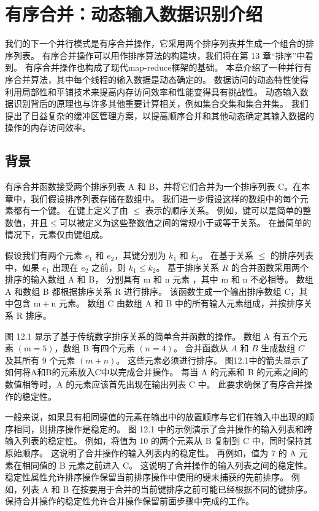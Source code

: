 \section{有序合并：动态输入数据识别介绍}
我们的下一个并行模式是有序合并操作，它采用两个排序列表并生成一个组合的排序列表。 
有序合并操作可以用作排序算法的构建块，我们将在第 13 章“排序”中看到。 有序合并操作也构成了现代map-reduce框架的基础。 
本章介绍了一种并行有序合并算法，其中每个线程的输入数据是动态确定的。 
数据访问的动态特性使得利用局部性和平铺技术来提高内存访问效率和性能变得具有挑战性。 
动态输入数据识别背后的原理也与许多其他重要计算相关，例如集合交集和集合并集。 
我们提出了日益复杂的缓冲区管理方案，以提高顺序合并和其他动态确定其输入数据的操作的内存访问效率。

\subsection{背景}
有序合并函数接受两个排序列表 A 和 B，并将它们合并为一个排序列表 C。在本章中，我们假设排序列表存储在数组中。 
我们进一步假设这样的数组中的每个元素都有一个键。 在键上定义了由 $\leq$ 表示的顺序关系。 
例如，键可以是简单的整数值，并且$\leq$可以被定义为这些整数值之间的常规小于或等于关系。 在最简单的情况下，元素仅由键组成。

假设我们有两个元素 $e_{1}$ 和 $e_{2}$，其键分别为 $k_{1}$ 和 $k_{2}$。 
在基于关系 $\leq$ 的排序列表中，如果 $e_{1}$ 出现在 $e_{2}$ 之前，则 $k_{1} \leq k_{2}$。 
基于排序关系 $R$ 的合并函数采用两个排序的输入数组 $\mathrm{A}$ 和 $\mathrm{B}$，
分别具有 $\mathrm{m}$ 和 $\mathrm{n}$ 元素 ，其中 $\mathrm{m}$ 和 $\mathrm{n}$ 不必相等。 
数组 A 和数组 B 都根据排序关系 $\mathrm{R}$ 进行排序。 
该函数生成一个输出排序数组 $\mathrm{C}$，其中包含 $\mathrm{m}+\mathrm{n}$ 元素。 
数组 $\mathrm{C}$ 由数组 $\mathrm{A}$ 和 $\mathrm{B}$ 中的所有输入元素组成，并按排序关系 $\mathrm{R}$ 排序。

图 12.1 显示了基于传统数字排序关系的简单合并函数的操作。 
数组 A 有五个元素 $(\mathrm{m}=5)$，数组 B 有四个元素 $(n=4)$。 
合并函数从 $A$ 和 $B$ 生成数组 $C$ 及其所有 9 个元素 $(m+n)$。 这些元素必须进行排序。 
图12.1中的箭头显示了如何将A和B的元素放入$\mathrm{C}$中以完成合并操作。 
每当 $\mathrm{A}$ 的元素和 B 的元素之间的数值相等时，A 的元素应该首先出现在输出列表 C 中。
此要求确保了有序合并操作的稳定性。

一般来说，如果具有相同键值的元素在输出中的放置顺序与它们在输入中出现的顺序相同，则排序操作是稳定的。 
图 12.1 中的示例演示了合并操作的输入列表和跨输入列表的稳定性。 
例如，将值为 10 的两个元素从 B 复制到 $\mathrm{C}$ 中，同时保持其原始顺序。 
这说明了合并操作的输入列表内的稳定性。 再例如，值为 7 的 A 元素在相同值的 $\mathrm{B}$ 元素之前进入 $\mathrm{C}$。 
这说明了合并操作的输入列表之间的稳定性。 稳定性属性允许排序操作保留当前排序操作中使用的键未捕获的先前排序。 
例如，列表 A 和 B 在按要用于合并的当前键排序之前可能已经根据不同的键排序。 
保持合并操作的稳定性允许合并操作保留前面步骤中完成的工作。


